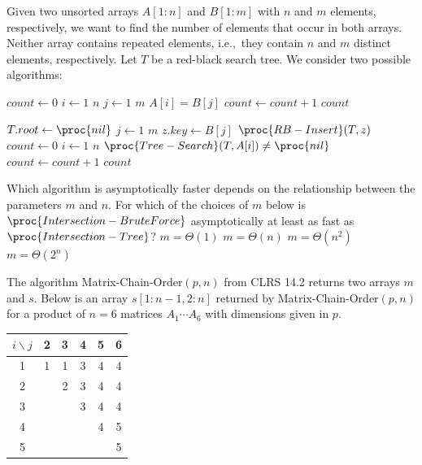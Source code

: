 Given two unsorted arrays $A[1:n]$ and $B[1:m]$ with $n$ and $m$ elements, respectively, we want to find the number of elements that occur in both arrays.
Neither array contains repeated elements, i.e.,~they contain $n$ and $m$ distinct elements, respectively.
Let $T$ be a red-black search tree. We consider two possible algorithms:
\begin{codebox}
\li $count \gets 0$
\li \For $i \gets 1$ \To $n$
\li \Do
        \For $j \gets 1$ \To $m$
\li     \Do
            \If $A[i] = B[j]$
\li         \Then $count \gets count + 1$
            \End
        \End
    \End
\li \Return $count$
\end{codebox}
\begin{codebox}
\li $T.root \gets \proc{nil}$ 
\li \For $j \gets 1$ \To $m$
\li \Do {}
\li $z.key \gets B[j]$
\li $\proc{RB-Insert}(T, z)$ \End
\li $count \gets 0$
\li \For $i \gets 1$ \To $n$
\li \Do
        \If $\proc{Tree-Search}(T, A[i]) \neq \proc{nil}$
\li     \Then $count \gets count + 1$
     \End
    \End
\li \Return $count$
\end{codebox}
Which algorithm is asymptotically faster depends on the relationship between the parameters $m$ and $n$.
For which of the choices of $m$ below is $\proc{Intersection-BruteForce}$ asymptotically at least as fast as $\proc{Intersection-Tree}$?
\multipleanswers
\optionsstart
\answer $m = \Theta(1)$\correct
\answer $m = \Theta(n)$
\answer $m = \Theta(n^2)$
\answer $m = \Theta(2^n)$\correct
\optionsend
{}

The algorithm {\sc Matrix-Chain-Order}$(p,n)$ from CLRS 14.2 returns two arrays $m$ and $s$.
Below is an array $s[1:n-1, 2:n]$ returned by {\sc Matrix-Chain-Order}$(p,n)$ for a product of $n=6$ matrices $A_1\cdots A_6$ with dimensions given in $p$.
\medskip

\begin{tabular}{c|ccccc}
$i \backslash j$ & 2 & 3 & 4 & 5 & 6 \\
\hline
1 & 1 & 1 & 3 & 4 & 4 \\
2 &   & 2 & 3 & 4 & 4 \\
3 &   &   & 3 & 4 & 4 \\
4 &   &   &   & 4 & 5 \\
5 &   &   &   &   & 5 \\
\end{tabular}

